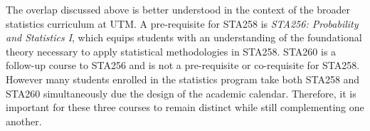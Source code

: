 \documentclass[11pt]{article}
\begin{document}

The overlap discussed above is better understood in the context of the broader statistics curriculum at UTM. 
A pre-requisite for STA258 is \textit{STA256: Probability and Statistics I}, which equips students with an understanding of the foundational theory necessary to apply statistical methodologies in STA258.
STA260 is a follow-up course to STA256 and is not a pre-requisite or co-requisite for STA258. 
However many students enrolled in the statistics program take both STA258 and STA260 simultaneously due the design of the academic calendar. 
Therefore, it is important for these three courses to remain distinct while still complementing one another.
\end{document}
